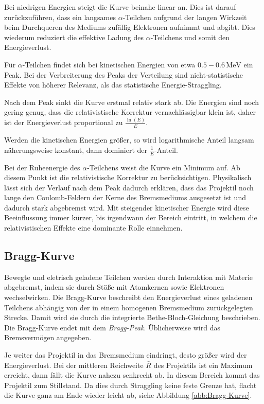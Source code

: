 \documentclass[12pt,a4paper]{scrartcl}
\numberwithin{equation}{section} %
\renewcommand{\[}{} %
\renewcommand{\]}{\noindent} %
\begin{document}
Bei niedrigen Energien steigt die Kurve beinahe linear an. Dies ist
darauf zurückzuführen, dass ein langsames $\alpha$-Teilchen aufgrund
der langen Wirkzeit beim Durchqueren des Mediums zufällig Elektronen
aufnimmt und abgibt. Dies wiederum reduziert die effektive Ladung
des $\alpha$-Teilchens und somit den Energieverlust.

Für $\alpha$-Teilchen findet sich bei kinetischen Energien von etwa
$0.5-0.6\mathrm{\,MeV}$ ein Peak. Bei der Verbreiterung des Peaks der
Verteilung sind nicht-statistische Effekte von höherer Relevanz, als das
statistische Energie-Straggling.

Nach dem Peak sinkt die Kurve erstmal relativ stark ab. Die Energien
sind noch gering genug, dass die relativistische Korrektur
vernachlässigbar klein ist, daher ist der Energieverlust proportional zu
$\frac{\ln(E)}{E}$.

Werden die kinetischen Energien größer, so wird logarithmische Anteil
langsam näherungsweise konstant, dann dominiert der
$\frac{1}{E}$-Anteil.

Bei der Ruheenergie des $\alpha$-Teilchens weist die Kurve ein Minimum
auf. Ab diesem Punkt ist die relativistische Korrektur zu
berücksichtigen. Physikalisch lässt sich der Verlauf nach dem Peak
dadurch erklären, dass das Projektil noch lange den Coulomb-Feldern der
Kerne des Bremsmediums ausgesetzt ist und dadurch stark abgebremst wird.
Mit steigender kinetischer Energie wird diese Beeinflussung immer
kürzer, bis irgendwann der Bereich eintritt, in welchem die
relativistischen Effekte eine dominante Rolle einnehmen.

\hypertarget{bragg-kurve}{%
\subsection{Bragg-Kurve}\label{bragg-kurve}}

Bewegte und eletrisch geladene Teilchen werden durch Interaktion mit
Materie abgebremst, indem sie durch Stöße mit Atomkernen sowie
Elektronen wechselwirken. Die Bragg-Kurve beschreibt den Energieverlust eines geladenen Teilchens abhängig von der in einem
homogenen Bremsmedium zurückgelegten Strecke. Damit wird sie durch die
integrierte Bethe-Bloch-Gleichung beschrieben. Die Bragg-Kurve endet mit
dem \emph{Bragg-Peak}. Üblicherweise wird das Bremsvermögen angegeben.

Je weiter das Projektil in das Bremsmedium eindringt, desto größer wird
der Energieverlust. Bei der mittleren Reichweite $\bar R$ des
Projektils ist ein Maximum erreicht, dann fällt die Kurve nahezu
senkrecht ab. In diesem Bereich kommt das Projektil zum Stillstand. Da
dies durch Straggling keine feste Grenze hat, flacht die Kurve ganz am
Ende wieder leicht ab, siehe Abbildung \ref{abb:Bragg-Kurve}.
\end{document}
